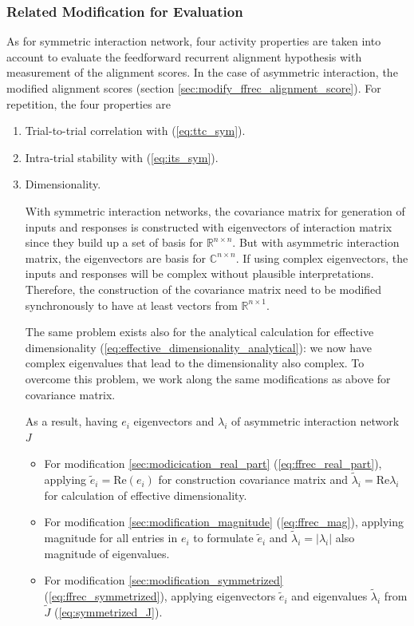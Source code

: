 \documentclass[11pt]{article}
\begin{document}
	\subsubsection{Related Modification for Evaluation} \label{sec:modification_asym}
	As for symmetric interaction network, four activity properties are taken into account to evaluate the feedforward recurrent alignment hypothesis with measurement of the alignment scores. In the case of asymmetric interaction, the modified alignment scores (section \ref{sec:modify_ffrec_alignment_score}). For repetition, the four properties are
		\begin{enumerate}
			\item Trial-to-trial correlation with (\ref{eq:ttc_sym}). %
			\item Intra-trial stability with (\ref{eq:its_sym}). %
			\item Dimensionality.%
			
				  With symmetric interaction networks, the covariance matrix for generation of inputs and responses is constructed with eigenvectors of interaction matrix since they build up a set of basis for $\mathbb{R}^{n \times n}$. But with asymmetric interaction matrix, the eigenvectors are basis for $\mathbb{C}^{n \times n}$. If using complex eigenvectors, the inputs and responses will be complex without plausible interpretations. Therefore, the construction of the covariance matrix need to be modified synchronously to have at least vectors from $\mathbb{R}^{n \times 1}$. 
				  
				  The same problem exists also for the analytical calculation for effective dimensionality (\ref{eq:effective_dimensionality_analytical}): we now have complex eigenvalues that lead to the dimensionality also complex. To overcome this problem, we work along the same modifications as above for covariance matrix.
				  
				  As a result, having $e_i$ eigenvectors and $\lambda_i$ of asymmetric interaction network $J$
				  \begin{itemize}
				  	\item For modification \ref{sec:modicication_real_part} (\ref{eq:ffrec_real_part}), applying $\tilde{e}_i = \text{Re}(e_i)$ for construction covariance matrix and $\tilde{\lambda}_i = \text{Re}\lambda_i$ for calculation of effective dimensionality. 
				  	\item For modification \ref{sec:modification_magnitude} (\ref{eq:ffrec_mag}), applying magnitude for all entries in $e_i$ to formulate $\tilde{e}_i$ and $\tilde{\lambda}_i = \vert \lambda_i \vert$ also magnitude of eigenvalues. 
				  	\item For modification \ref{sec:modification_symmetrized} (\ref{eq:ffrec_symmetrized}), applying eigenvectors $\tilde{e}_i$ and eigenvalues $\tilde{\lambda}_i$ from $\tilde{J}$ (\ref{eq:symmetrized_J}).
				  \end{itemize}
			  		

\end{enumerate}
\end{document}
